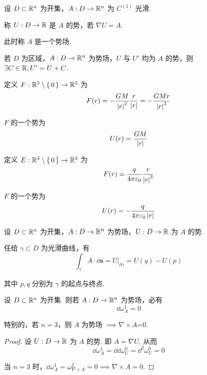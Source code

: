 
\begin{definition}
    设 $D\subset\mathbb{R}^n$ 为开集，$A:D\to\mathbb{R}^n$ 为 $C^{(1)}$ 光滑.
    
    称 $U:D\to\mathbb{R}$ 是 $A$ 的势，若 $\nabla U=A$.

    此时称 $A$ 是一个势场.
\end{definition}

\begin{property}
    若 $D$ 为区域，$A:D\to\mathbb{R}^n$ 为势场，$U$ 与 $U'$ 均为 $A$ 的势，则 $\exists C\in\mathbb{R},U'=U+C$.
\end{property}

\begin{example}[ 万有引力场]
    定义 $F:\mathbb{R}^3\setminus\set{0}\to\mathbb{R}^3$ 为
$$
F(r)=-\frac{GM}{\left\lvert{r}\right\rvert^2}\frac{r}{\left\lvert{r}\right\rvert}=-\frac{GMr}{\left\lvert{r}\right\rvert^3}
$$

    $F$ 的一个势为
$$
U(r)=\frac{GM}{\left\lvert{r}\right\rvert}
$$
\end{example}

\begin{example}[ 点电荷的静电场]
    定义 $E:\mathbb{R}^3\setminus\set{0}\to\mathbb{R}^3$ 为
$$
F(r)=\frac{q}{4\pi\varepsilon_0}\frac{r}{\left\lvert{r}\right\rvert^3}
$$

    $F$ 的一个势为
$$
U(r)=-\frac{q}{4\pi\varepsilon_0\left\lvert{r}\right\rvert}
$$
\end{example}

\begin{property}
    设 $D\subset\mathbb{R}^n$ 为开集，$A:D\to\mathbb{R}^n$ 为势场，$U:D\to\mathbb{R}$ 为 $A$ 的势.
    
    任给 $\gamma\subset D$ 为光滑曲线，有
$$
\int_\gamma A\cdot\dd\mathbf{s}=U\biggr |_{\partial\gamma}=U(q)-U(p)
$$

    其中 $p,q$ 分别为 $\gamma$ 的起点与终点.
\end{property}


\begin{property}
    设 $D\subset\mathbb{R}^n$ 为开集. 则若 $A:D\to\mathbb{R}^n$ 为势场，必有
$$
\dd\omega_A^1=0
$$

    特别的，若 $n=3$，则 $A$ 为势场 $\implies\nabla\times A$=0.
\end{property}
\begin{proof}
    设 $U:D\to\mathbb{R}$ 为 $A$ 的势. 即 $A=\nabla U$. 从而
$$
\dd\omega_A^1=\dd\dd\omega_U^0=\dd^2\omega_U^0=0
$$

    当 $n=3$ 时，$\dd\omega_A^1=\omega_{\nabla\times A}^2=0\implies\nabla\times A=0$.
\end{proof}

